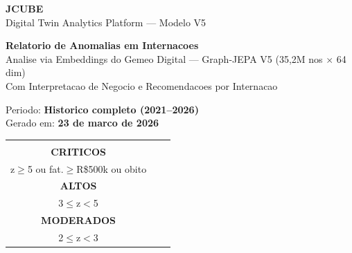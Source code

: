 \documentclass[a4paper,10pt]{article}
\begin{document}
\setlength{\parindent}{0pt}
\setlength{\parskip}{3pt}

\begin{titlepage}
\begin{center}
\vspace*{1.5cm}
{\Huge\bfseries\textcolor{jcubeblue}{JCUBE}}\\[0.2cm]
{\large\textcolor{jcubegray}{Digital Twin Analytics Platform --- Modelo V5}}\\[1.2cm]
\begin{tcolorbox}[colback=jcubeblue,colframe=jcubeblue,coltext=white,width=0.92\textwidth,halign=center]
{\LARGE\bfseries Relatorio de Anomalias em Internacoes}\\[0.3cm]
{\large Analise via Embeddings do Gemeo Digital --- Graph-JEPA V5 (35,2M nos $\times$ 64 dim)}\\[0.2cm]
{\normalsize Com Interpretacao de Negocio e Recomendacoes por Internacao}
\end{tcolorbox}
\vspace{0.8cm}

{\Large Periodo: \textbf{Historico completo (2021--2026)}}\\[0.4cm]
{\large Gerado em: \textbf{23 de marco de 2026}}\\[1.5cm]
\begin{tabular}{ccc}
\begin{tcolorbox}[colback=anomred!10,colframe=anomred,width=3.8cm,halign=center,left=3pt,right=3pt]
{\LARGE\bfseries\textcolor{anomred}{17}}\\[2pt]
{\small\textbf{CRITICOS}}\\
{\scriptsize z$\geq$5 ou fat.$\geq$R\$500k ou obito}
\end{tcolorbox}
&
\begin{tcolorbox}[colback=anomorange!10,colframe=anomorange,width=3.8cm,halign=center,left=3pt,right=3pt]
{\LARGE\bfseries\textcolor{anomorange}{65}}\\[2pt]
{\small\textbf{ALTOS}}\\
{\scriptsize 3$\leq$z$<$5}
\end{tcolorbox}
&
\begin{tcolorbox}[colback=anomyellow!10,colframe=anomyellow,width=3.8cm,halign=center,left=3pt,right=3pt]
{\LARGE\bfseries\textcolor{anomyellow}{208}}\\[2pt]
{\small\textbf{MODERADOS}}\\
{\scriptsize 2$\leq$z$<$3}
\end{tcolorbox}
\end{tabular}


\end{center}
\end{titlepage}
\end{document}
